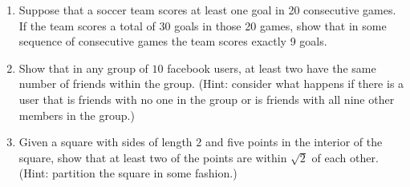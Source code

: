 \documentclass[letterpaper,12pt,fleqn]{article}
\begin{document}
\begin{enumerate}[left=0in,itemsep=0.5in]
\item Suppose that a soccer team scores at least one goal in 20 consecutive games.  If the team scores a total of 30
  goals in those 20 games, show that in some sequence of consecutive games the team scores exactly 9 goals.

\item Show that in any group of \(10\) facebook users, at least two have the same number of friends within the group.
  (Hint: consider what happens if there is a user that is friends with no one in the group or is friends with
  all nine other members in the group.)

\item Given a square with sides of length \(2\) and five points in the interior of the square, show that at least
  two of the points are within \(\sqrt{2}\) of each other.  (Hint: partition the square in some fashion.)
\end{enumerate}
\end{document}
